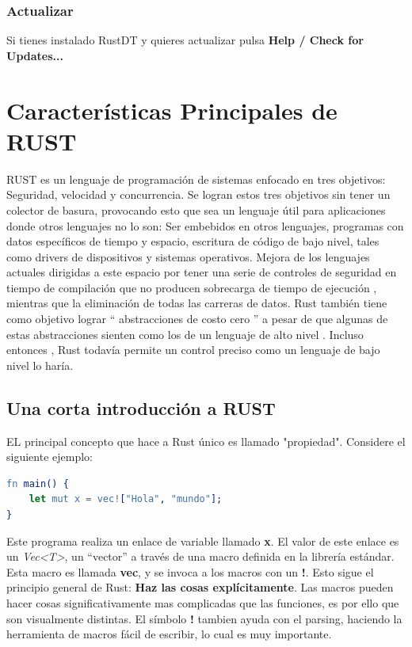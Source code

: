 \documentclass[12pt, twoside]{report}
\begin{document}
\subsection{Actualizar}

Si tienes instalado RustDT y quieres actualizar pulsa \textbf{Help / Check for Updates...}

\chapter{Características Principales de RUST}

RUST es un lenguaje de programación de sistemas enfocado en tres objetivos: Seguridad, velocidad y concurrencia. Se logran estos tres objetivos sin tener un colector de basura, provocando esto que sea un lenguaje útil  para aplicaciones donde otros lenguajes no lo son: Ser embebidos en otros lenguajes, programas con datos específicos de tiempo y espacio, escritura de código de bajo nivel, tales como drivers de dispositivos y sistemas operativos. Mejora de los lenguajes actuales dirigidas a este espacio por tener una serie de controles de seguridad en tiempo de compilación que no producen sobrecarga de tiempo de ejecución , mientras que la eliminación de todas las carreras de datos. Rust también tiene como objetivo lograr `` abstracciones  de costo cero '' a pesar de que algunas de estas abstracciones sienten como los de un lenguaje de alto nivel . Incluso entonces , Rust todavía permite un control preciso como un lenguaje de bajo nivel lo haría.

\section{Una corta introducción a RUST}

EL principal concepto que hace a Rust único es llamado "propiedad". Considere el siguiente ejemplo:

\begin{lstlisting}[language=erlang]
fn main() {
	let mut x = vec!["Hola", "mundo"];
}
\end{lstlisting}

Este programa realiza un enlace de variable llamado \textbf{x}. El valor de este enlace  es un\textit{ Vec<T>}, un ``vector'' a través de una macro definida en la librería estándar. Esta macro es llamada \textbf{vec}, y se invoca a los macros con un \textbf{!}. Esto sigue el principio general de Rust: \textbf{Haz las cosas explícitamente}. Las macros pueden hacer cosas significativamente mas complicadas que las funciones, es por ello que son visualmente distintas. El símbolo \textbf{!} tambien ayuda con el parsing, haciendo la herramienta de macros fácil de escribir, lo cual es muy importante.
\end{document}
